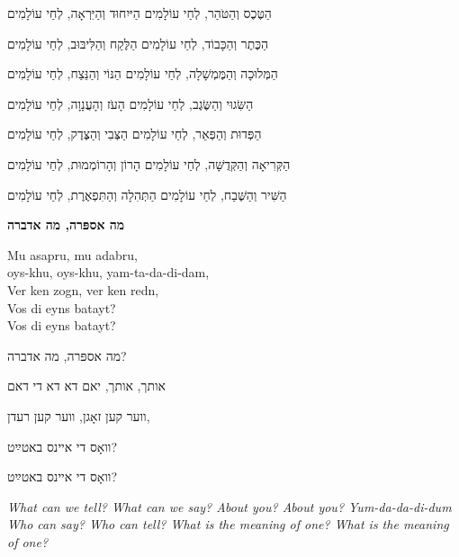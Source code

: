הַטֶּכֶס וְהַטֹּהַר, לְחַי עוֹלָמִים
\hfill
הַיּיִחוּד וְהַיִּרְאָה, לְחַי עוֹלָמִים

הַכֶּתֶר וְהַכָּבוֹד, לְחַי עוֹלָמִים
\hfill
הַלֶּקַח וְהַלִּיבּוּב, לְחַי עוֹלָמִים

הַמְּלוּכָה וְהַמֶּמְשָׁלָה, לְחַי עוֹלָמִים
\hfill
הַנּוֹי וְהַנֵּצַח, לְחַי עוֹלָמִים

הַשִּׂגוּי וְהַשֶּׂגֶב, לְחַי עוֹלָמִים
\hfill
הָעֹז וְהָעֲנָוָה, לְחַי עוֹלָמִים

הַפְּדוּת וְהַפְּאֵר, לְחַי עוֹלָמִים
\hfill
הַצְּבִי וְהַצֶּדֶק, לְחַי עוֹלָמִים

הַקְּרִיאָה וְהַקְּדֻשָּׁה, לְחַי עוֹלָמִים
\hfill
הָרוֹן וְהָרוֹמְמוּת, לְחַי עוֹלָמִים

הַשִּׁיר וְהַשֶּׁבַח, לְחַי עוֹלָמִים
\hfill
הַתְּהִלָה וְהַתִּפְאֶרֶת, לְחַי עוֹלָמִים

\break
\begin{center}
{\large \bfseries
מה אספּרה, מה אדברה
}
\end{center}

\begin{minipage}{0.52\linewidth}
\begin{english}
Mu asapru, mu adabru, \\
oys-khu, oys-khu, yam-ta-da-di-dam, \\
Ver ken zogn, ver ken redn, \\
Vos di eyns batayt? \\
Vos di eyns batayt?
\end{english}
\end{minipage} \hspace{0.02\linewidth}
\begin{minipage}{0.44\linewidth}
מה אספּרה, מה אדברה?

אותך, אותך, יאם דא דא די דאם

ווער קען זאָגן, ווער קען רעדן, 

וואָס די איינס באטײַט?

וואָס די איינס באטײַט?
\end{minipage}

\vspace{1em}

\begin{english}
{\itshape
What can we tell? 
What can we say?
About you? About you?
Yum-da-da-di-dum \\
Who can say? 
Who can tell?
What is the meaning of one?
What is the meaning of one?}
\end{english}

